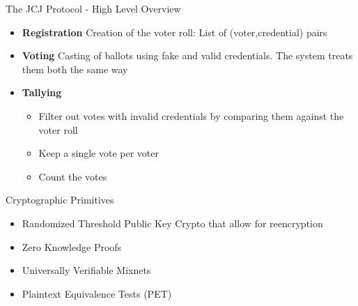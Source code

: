 \documentclass{beamer}
\begin{document}
\begin{frame}{The JCJ Protocol - High Level Overview}
\begin{itemize}
\item \textbf{Registration} Creation of the voter roll: List of (voter,credential) pairs
\item \textbf{Voting} Casting of ballots using fake and valid credentials. The system treats them both the same way
\item \textbf{Tallying}
\begin{itemize}
\item Filter out votes with invalid credentials by comparing them against the voter roll
\item Keep a single vote per voter
\item Count the votes
\end{itemize}
\end{itemize}
\begin{block}{Cryptographic Primitives}
\begin{itemize}
\item Randomized Threshold Public Key Crypto that allow for reencryption
\item Zero Knowledge Proofs
\item Universally Verifiable Mixnets
\item Plaintext Equivalence Tests (PET)
\end{itemize}
\end{block}
\end{frame}
\end{document}
